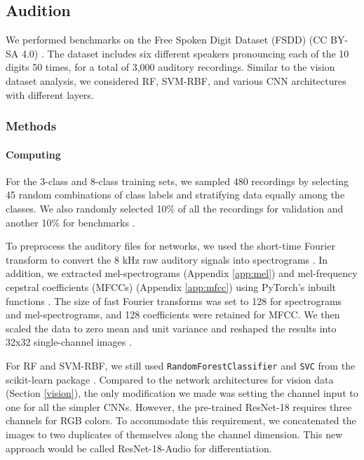 \subsection{Audition}
\label{audition}
We performed benchmarks on the Free Spoken Digit Dataset (FSDD) (CC BY-SA 4.0) \citep{FSDD}. The dataset includes six different speakers pronouncing each of the 10 digits 50 times, for a total of 3,000 auditory recordings. Similar to the vision dataset analysis, we considered RF, SVM-RBF, and various CNN architectures with different layers.

\subsubsection{Methods}
\paragraph{Computing}
For the 3-class and 8-class training sets, we sampled 480 recordings by selecting 45 random combinations of class labels and stratifying data equally among the classes. We also randomly selected 10\% of all the recordings for validation and another 10\% for benchmarks \citep{nasr, tian}.

To preprocess the auditory files for networks, we used the short-time Fourier transform to convert the 8 kHz raw auditory signals into spectrograms \citep{wyse}. In addition, we extracted mel-spectrograms (Appendix \ref{app:mel}) and mel-frequency cepstral coefficients (MFCCs) (Appendix \ref{app:mfcc}) using PyTorch's inbuilt functions \citep{pytorch}.
The size of fast Fourier transforms was set to 128 for spectrograms and mel-spectrograms, and 128 coefficients were retained for MFCC. We then scaled the data to zero mean and unit variance and reshaped the results into 32x32 single-channel images \citep{lecun2012efficient}. 

For RF and SVM-RBF, we still used \texttt{RandomForestClassifier} and \texttt{SVC} from the scikit-learn package \citep{scikit-learn}. Compared to the network architectures for vision data (Section \ref{vision}), the only modification we made was setting the channel input to one for all the simpler CNNs. However, the pre-trained ResNet-18 requires three channels for RGB colors. To accommodate this requirement, we concatenated the images to two duplicates of themselves along the channel dimension. This new approach would be called ResNet-18-Audio for differentiation.

